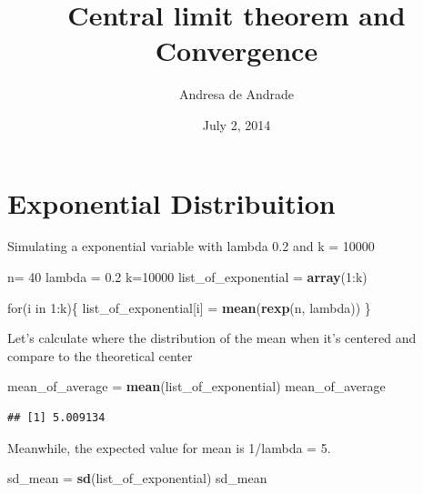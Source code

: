 \documentclass[]{article}
\title{Central limit theorem and Convergence}
\author{Andresa de Andrade}
\date{July 2, 2014}
\newenvironment{Shaded}{\begin{snugshade}}{\end{snugshade}}
\newcommand{\KeywordTok}[1]{\textcolor[rgb]{0.13,0.29,0.53}{\textbf{{#1}}}}
\newcommand{\DecValTok}[1]{\textcolor[rgb]{0.00,0.00,0.81}{{#1}}}
\newcommand{\FloatTok}[1]{\textcolor[rgb]{0.00,0.00,0.81}{{#1}}}
\newcommand{\StringTok}[1]{\textcolor[rgb]{0.31,0.60,0.02}{{#1}}}
\newcommand{\NormalTok}[1]{{#1}}
\begin{document}
\maketitle


{
\hypersetup{linkcolor=black}
\setcounter{tocdepth}{2}
\tableofcontents
}
\newpage 

\section{Exponential Distribuition}\label{exponential-distribuition}

Simulating a exponential variable with lambda 0.2 and k = 10000

\begin{Shaded}
\begin{Highlighting}[]
\NormalTok{n=}\StringTok{ }\DecValTok{40}
\NormalTok{lambda =}\StringTok{ }\FloatTok{0.2}
\NormalTok{k=}\DecValTok{10000}
\NormalTok{list_of_exponential =}\StringTok{ }\KeywordTok{array}\NormalTok{(}\DecValTok{1}\NormalTok{:k)}

\NormalTok{for(i in }\DecValTok{1}\NormalTok{:k)\{}
  \NormalTok{list_of_exponential[i] =}\StringTok{ }\KeywordTok{mean}\NormalTok{(}\KeywordTok{rexp}\NormalTok{(n, lambda))}
\NormalTok{\}}
\end{Highlighting}
\end{Shaded}

Let's calculate where the distribution of the mean when it's centered
and compare to the theoretical center

\begin{Shaded}
\begin{Highlighting}[]
\NormalTok{mean_of_average =}\StringTok{ }\KeywordTok{mean}\NormalTok{(list_of_exponential)}
\NormalTok{mean_of_average}
\end{Highlighting}
\end{Shaded}

\begin{verbatim}
## [1] 5.009134
\end{verbatim}

Meanwhile, the expected value for mean is 1/lambda = 5.

\begin{Shaded}
\begin{Highlighting}[]
\NormalTok{sd_mean =}\StringTok{ }\KeywordTok{sd}\NormalTok{(list_of_exponential)}
\NormalTok{sd_mean}
\end{Highlighting}
\end{Shaded}
\end{document}
